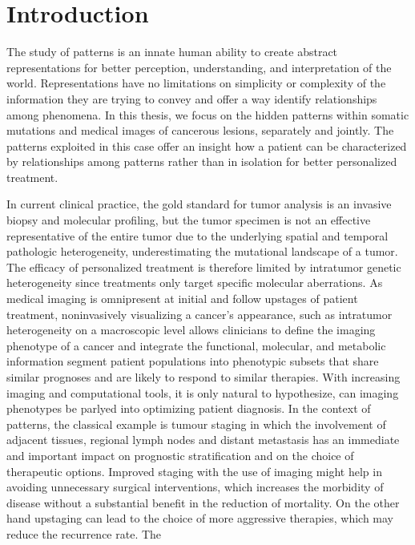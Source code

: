 \chapter{Introduction}
\label{ch:intro}

The study of patterns is an innate human ability to create abstract representations for better perception, understanding, and interpretation of the world.  Representations have no limitations on simplicity or complexity of the information they are trying to convey and offer a way identify relationships among phenomena.  In this thesis, we focus on the hidden patterns within somatic mutations and medical images of cancerous lesions, separately and jointly.  The patterns exploited in this case offer an insight how a patient can be characterized by relationships among patterns rather than in isolation for better personalized treatment.  

In current clinical practice, the gold standard for tumor analysis is an invasive biopsy and molecular profiling, but the tumor specimen is not an effective representative of the entire tumor due to the underlying spatial and temporal pathologic heterogeneity, underestimating the mutational landscape of a tumor.  The efficacy of personalized treatment is therefore limited by intratumor genetic heterogeneity since treatments only target specific molecular aberrations.  As medical imaging is omnipresent at initial and follow upstages of patient treatment, noninvasively visualizing a cancer’s appearance, such as intratumor heterogeneity on a macroscopic level allows clinicians to define the imaging phenotype of a cancer and integrate the functional, molecular, and metabolic information segment patient populations into phenotypic subsets that share similar prognoses and are likely to respond to similar therapies.  With increasing imaging and computational tools, it is only natural to hypothesize, can imaging phenotypes be parlyed into optimizing patient diagnosis.  In the context of patterns, the classical example is tumour staging in which the involvement of adjacent tissues, regional lymph nodes and distant metastasis has an immediate and important impact on prognostic stratification and on the choice of therapeutic options. Improved staging with the use of imaging might help in avoiding unnecessary surgical interventions, which increases the morbidity of disease without a substantial benefit in the reduction of mortality. On the other hand upstaging can lead to the choice of more aggressive therapies, which may reduce the recurrence rate.  The  



